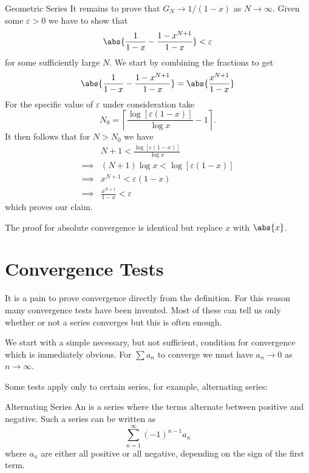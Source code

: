 \documentclass[fleqn]{NotesClass}
\begin{document}
\begin{exm}{Geometric Series}{}
        It remains to prove that \(G_N \to 1/(1 - x)\) as \(N \to \infty\).
        Given some \(\varepsilon > 0\) we have to show that
        \begin{equation}
            \abs{\frac{1}{1 - x} - \frac{1 - x^{N+1}}{1 - x}} < \varepsilon
        \end{equation}
        for some sufficiently large \(N\).
        We start by combining the fractions to get
        \begin{equation}
            \abs{\frac{1}{1 - x} - \frac{1 - x^{N+1}}{1 - x}} = \abs{\frac{x^{N+1}}{1 - x}}
        \end{equation}
        For the specific value of \(\varepsilon\) under consideration take
        \begin{equation}
            N_0 = \left\lceil \frac{\log[\varepsilon(1 - x)]}{\log x} - 1 \right\rceil.
        \end{equation}
        It then follows that for \(N > N_0\) we have
        \begin{align}
            &N + 1 < \frac{\log[\varepsilon(1 - x)]}{\log x}\\
            \implies &(N + 1)\log x <  \log[\varepsilon(1-x)]\\
            \implies &x^{N+1} < \varepsilon(1 - x)\\
            \implies &\frac{x^{N+1}}{1 - x} < \varepsilon
        \end{align}
        which proves our claim.
        
        The proof for absolute convergence is identical but replace \(x\) with \(\abs{x}\).
    \end{exm}
    
    \section{Convergence Tests}
    It is a pain to prove convergence directly from the definition.
    For this reason many convergence tests have been invented.
    Most of these can tell us only whether or not a series converges but this is often enough.
    
    We start with a simple necessary, but not sufficient, condition for convergence which is immediately obvious.
    For \(\sum a_n\) to converge we must have \(a_n \to 0\) as \(n \to \infty\).
    
    Some tests apply only to certain series, for example, alternating series:
    \begin{dfn}{Alternating Series}{}
        An  is a series where the terms alternate between positive and negative.
        Such a series can be written as
        \begin{equation}
            \sum_{n=1}^{\infty} (-1)^{n-1}a_n
        \end{equation}
        where \(a_n\) are either all positive or all negative, depending on the sign of the first term.
    \end{dfn}
    
\end{document}
